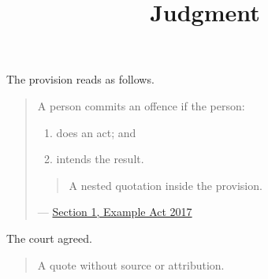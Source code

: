 \documentclass[11pt,a4paper]{article}
\title{Judgment}
\begin{document}
\maketitle

The provision reads as follows.

\begin{quote}
A person commits an offence if the person:

\begin{enumerate}
\item does an act; and
\item intends the result.
\end{enumerate}

\begin{quote}
A nested quotation inside the provision.
\end{quote}

\hfill--- \href{https://example.org/judgments/2017/5\#para45}{Section 1, Example Act 2017}
\end{quote}

The court agreed.

\begin{quote}
A quote without source or attribution.
\end{quote}
\end{document}
